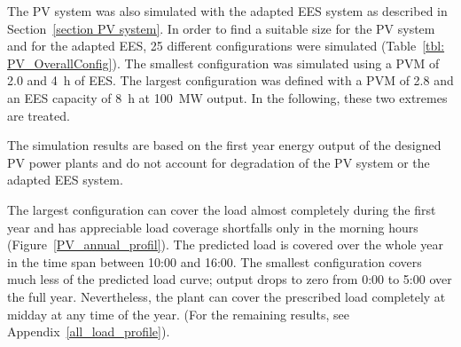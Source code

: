 The \ac{PV} system was also simulated with the adapted \ac{EES} system as described in Section~\ref{section PV system}. In order to find a suitable size for the \ac{PV} system and for the adapted \ac{EES}, 25 different configurations were simulated (Table~\ref{tbl: PV_OverallConfig}). The smallest configuration was simulated using a \ac{PVM} of \num{2.0} and \SI{4}{h} of \ac{EES}. The largest configuration was defined with a \ac{PVM} of \num{2.8} and an \ac{EES} capacity of \SI{8}{h} at \SI{100}{\mega\watt} output. In the following, these two extremes are treated. 


The simulation results are based on the first year energy output of the designed \ac{PV} power plants and do not account for degradation of the \ac{PV} system or the adapted \ac{EES} system. 


The largest configuration can cover the load almost completely during the first year and has appreciable load coverage shortfalls only in the morning hours (Figure~\ref{PV_annual_profil}). The predicted load is covered over the whole year in the time span between 10:00 and 16:00. The smallest configuration covers much less of the predicted load curve; output drops to zero from 0:00 to 5:00 over the full year. Nevertheless, the plant can cover the prescribed load completely at midday at any time of the year. (For the remaining results, see Appendix~\ref{all_load_profile}).

